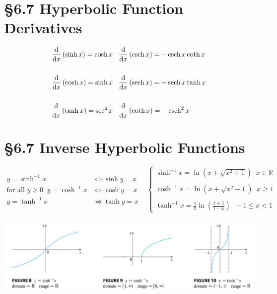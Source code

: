 \section*{\S{6.7} Hyperbolic Function Derivatives}
\begin{equation}
\begin{split}
    \frac{\mathrm{d}}{\mathrm{d}x}\left({\sinh x}\right) = \cosh x \;\;\;& \frac{\mathrm{d}}{\mathrm{d}x}\left({\operatorname{csch} x}\right) = -\operatorname{csch} x \coth x \\\\
    \frac{\mathrm{d}}{\mathrm{d}x}\left({\cosh x}\right) = \sinh x \;\;\;& \frac{\mathrm{d}}{\mathrm{d}x}\left({\operatorname{sech} x}\right) = -\operatorname{sech} x \tanh x \\\\
    \frac{\mathrm{d}}{\mathrm{d}x}\left({\tanh x}\right) = \sec^2 x \;\;\;& \frac{\mathrm{d}}{\mathrm{d}x}\left({\coth x}\right) = -\operatorname{csch}^2 x
\end{split}
\end{equation}

\section*{\S{6.7} Inverse Hyperbolic Functions}
\begin{equation}
\begin{split}
    y = \sinh^{-1} x &\iff \sinh y = x\\
    \text{for all $y \geq 0$}\;\; y = \cosh^{-1} x &\iff \cosh y = x\\
    y = \tanh^{-1} x &\iff \tanh y = x
\end{split}
\;\;\;\left\{
\begin{array}{ll}
    \sinh^{-1} x = \ln\left( x + \sqrt{x^2 + 1} \right) \;\; x \in \mathbb{R} \\\\
    \cosh^{-1} x = \ln\left( x + \sqrt{x^2 - 1} \right) \;\; x \geq 1 \\\\
    \tanh^{-1} x = \frac{1}{2} \ln\left(\frac{x + 1}{1 - x}\right) \;\; -1 \leq x < 1
\end{array}
\right.
\end{equation}
\begin{center}
    \includegraphics[width=1.0\linewidth]{../images/calc-textbook/6.7/6.png}
\end{center}

